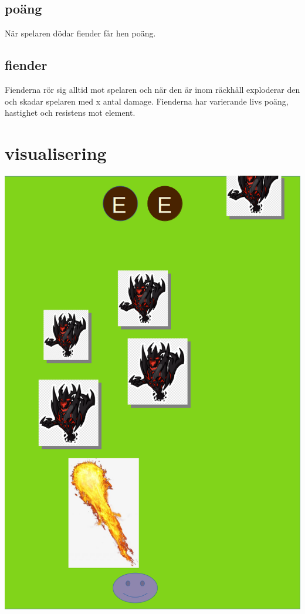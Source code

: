 \documentclass[12pt]{TDP005mall}
\begin{document}
\subsection{poäng}
När spelaren dödar fiender får hen poäng.
\subsection{fiender}
Fienderna rör sig alltid mot spelaren och när den är inom räckhåll exploderar den och skadar spelaren med x antal damage. Fienderna har varierande livs poäng, hastighet och resistens mot element.
\section{visualisering}
\begin{center}
\includegraphics[scale=0.5]{spel.png}
\end{center}
\newpage
\end{document}
